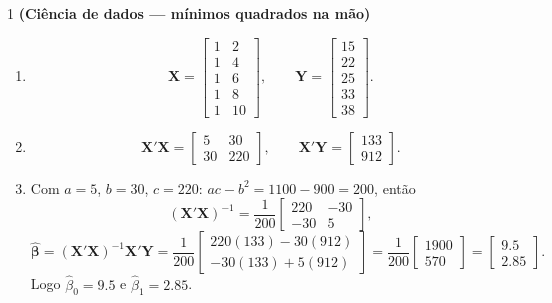 \documentclass[11pt]{article}
\begin{document}

\begin{questao}{1} \textbf{(Ciência de dados --- mínimos quadrados na mão)}
\end{questao}
\begin{solucao}
\begin{enumerate}[label=(\alph*)]
  \item
  $$
  \mathbf{X} = \begin{bmatrix} 1 & 2 \\ 1 & 4 \\ 1 & 6 \\ 1 & 8 \\ 1 & 10 \end{bmatrix}, \qquad
  \mathbf{Y} = \begin{bmatrix} 15 \\ 22 \\ 25 \\ 33 \\ 38 \end{bmatrix}.
  $$
  \item
  $$
  \mathbf{X}'\mathbf{X} = \begin{bmatrix} 5 & 30 \\ 30 & 220 \end{bmatrix}, \qquad
  \mathbf{X}'\mathbf{Y} = \begin{bmatrix} 133 \\ 912 \end{bmatrix}.
  $$
  \item Com $a=5$, $b=30$, $c=220$: $ac - b^2 = 1100 - 900 = 200$, então
  $$
  (\mathbf{X}'\mathbf{X})^{-1} = \frac{1}{200}\begin{bmatrix} 220 & -30 \\ -30 & 5 \end{bmatrix},
  $$
  $$
  \hat{\boldsymbol\beta} = (\mathbf{X}'\mathbf{X})^{-1}\mathbf{X}'\mathbf{Y} =
  \frac{1}{200}\begin{bmatrix} 220(133) - 30(912) \\ -30(133) + 5(912) \end{bmatrix} =
  \frac{1}{200}\begin{bmatrix} 1900 \\ 570 \end{bmatrix} = \begin{bmatrix} 9.5 \\ 2.85 \end{bmatrix}.
  $$
  Logo $\hat\beta_0 = 9.5$ e $\hat\beta_1 = 2.85$.

\end{enumerate}
\end{solucao}
\end{document}
